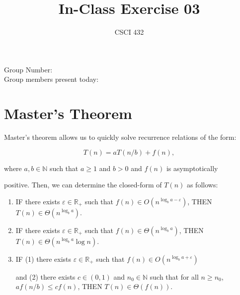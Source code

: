 \documentclass{article}
\title{In-Class Exercise 03}
\author{CSCI 432}
\def\R{{\mathbb R}}
\def\N{{\mathbb N}}
\begin{document}
\maketitle



\noindent

Group Number:\\

Group members present today:



\section*{Master's Theorem}



Master's theorem allows us to quickly solve recurrence relations of the form:

$$ T(n) = a T(n/b) + f(n),$$

where $a, b \in \N$ such that $a \geq 1$ and $b >0$ and $f(n)$ is asymptotically

positive.  Then, we can determine the closed-form of $T(n)$ as follows:

\begin{enumerate}

    \item IF there exists $\varepsilon \in \R_+$ such that $f(n) \in O(n^{\log_b

        a - \varepsilon})$, THEN $T(n) \in \Theta(n^{\log_b a})$.

    \item IF there exists $\varepsilon \in \R_+$ such that $f(n) \in \Theta(n^{\log_b

        a})$, THEN $T(n) \in \Theta(n^{\log_b a}\log n)$.

    \item IF (1) there exists $\varepsilon \in \R_+$ such that $f(n) \in O(n^{\log_b

        a + \varepsilon})$

        and (2) there exists $c \in (0,1)$ and $n_0 \in \N$ such that for all $n

        \geq n_0$, $a f(n/b) \leq c f(n)$, THEN $T(n) \in \Theta(f(n))$.

\end{enumerate}
\end{document}
